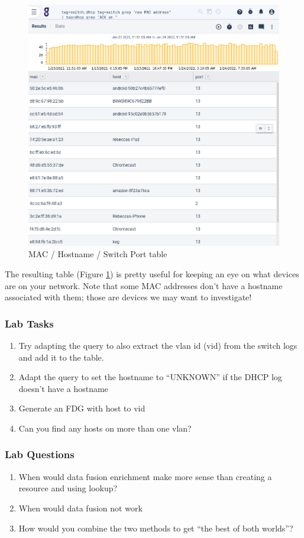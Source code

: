 \begin{figure}
	\includegraphics[width=0.6\linewidth]{images/mac-host-table.png}
	\caption{MAC / Hostname / Switch Port table}
	\label{fig:mac-host-table}
\end{figure}

The resulting table (Figure \ref{fig:mac-host-table}) is pretty useful for keeping an eye on what devices are on your network. Note that some MAC addresses don't have a hostname associated with them; those are devices we may want to investigate!

\subsubsection{Lab Tasks}

\begin{enumerate}
\item
  Try adapting the query to also extract the vlan id (vid) from the
  switch logs and add it to the table.
\item
  Adapt the query to set the hostname to ``UNKNOWN'' if the DHCP log
  doesn't have a hostname
\item
  Generate an FDG with host to vid
\item
  Can you find any hosts on more than one vlan?
\end{enumerate}

\begin{samepage}
\subsubsection{Lab Questions}
\begin{enumerate}
\item
  {When would data fusion enrichment make more sense than creating a
  resource and using lookup?}
\item
  {When would data fusion not work}
\item
  {How would you combine the two methods to get ``the best of both
  worlds''?}
\end{enumerate}
\end{samepage}

